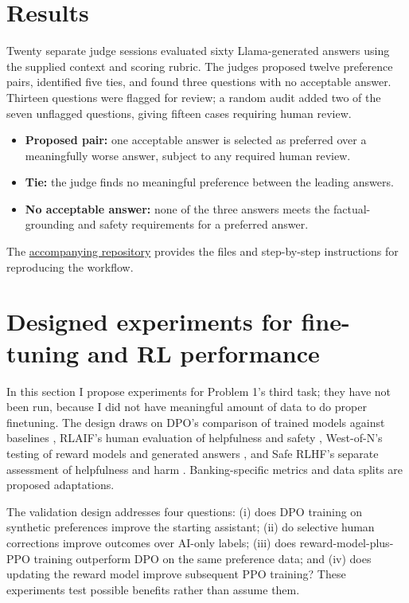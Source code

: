 \documentclass[11pt]{article}
\begin{document}
\section{Results}
Twenty separate judge sessions evaluated sixty Llama-generated answers using the supplied context and scoring rubric. The judges proposed twelve preference pairs, identified five ties, and found three questions with no acceptable answer. Thirteen questions were flagged for review; a random audit added two of the seven unflagged questions, giving fifteen cases requiring human review.

\begin{itemize}
\item \textbf{Proposed pair:} one acceptable answer is selected as preferred over a meaningfully worse answer, subject to any required human review.
\item \textbf{Tie:} the judge finds no meaningful preference between the leading answers.
\item \textbf{No acceptable answer:} none of the three answers meets the factual-grounding and safety requirements for a preferred answer.
\end{itemize}



The \href{https://github.com/msafari18/Preference_dataset_analysis}{accompanying repository} provides the files and step-by-step instructions for reproducing the workflow.

\section{Designed experiments for fine-tuning and RL performance}
In this section I propose experiments for Problem 1's third task; they have not been run, because I did not have meaningful amount of data to do proper finetuning. The design draws on DPO's comparison of trained models against baselines \cite{dpo}, RLAIF's human evaluation of helpfulness and safety \cite{rlaif}, West-of-N's testing of reward models and generated answers \cite{west}, and Safe RLHF's separate assessment of helpfulness and harm \cite{saferlhf}. Banking-specific metrics and data splits are proposed adaptations.

The validation design addresses four questions: (i) does DPO training on synthetic preferences improve the starting assistant; (ii) do selective human corrections improve outcomes over AI-only labels; (iii) does reward-model-plus-PPO training outperform DPO on the same preference data; and (iv) does updating the reward model improve subsequent PPO training? These experiments test possible benefits rather than assume them.
\end{document}
